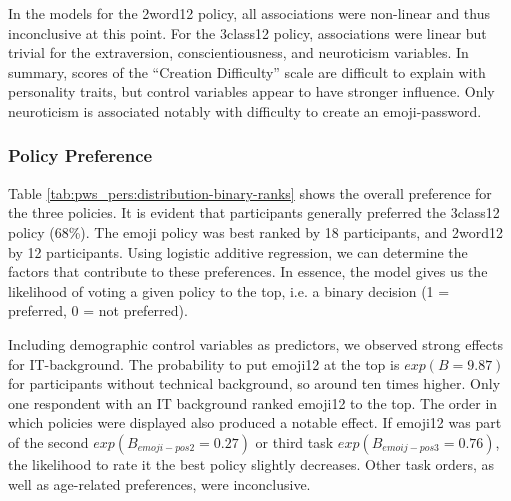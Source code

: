 In the models for the 2word12 policy, all associations were non-linear and thus inconclusive at this point. For the 3class12 policy, associations were linear but trivial for the extraversion, conscientiousness, and neuroticism variables. In summary, scores of the ``Creation Difficulty'' scale are difficult to explain with personality traits, but control variables appear to have stronger influence. Only neuroticism is associated notably with difficulty to create an emoji-password.

\subsubsection{Policy Preference}
Table \ref{tab:pws_pers:distribution-binary-ranks} shows the overall preference for the three policies. It is evident that participants generally preferred the 3class12 policy (68\%). The emoji policy was best ranked by 18 participants, and 2word12 by 12 participants. Using logistic additive regression, we can determine the factors that contribute to these preferences. %
In essence, the model gives us the likelihood of voting a given policy to the top, i.e. a binary decision (1 = preferred, 0 = not preferred). 

Including demographic control variables as predictors, we observed strong effects for IT-background. The probability to put emoji12 at the top is $exp(B=9.87)$ for participants without technical background, so around ten times higher. Only one respondent with an IT background ranked emoji12 to the top. %
The order in which policies were displayed also produced a notable effect. If emoji12 was part of the second $exp(B_{emoji-pos2}=0.27)$ or third task $exp(B_{emoij-pos3}=0.76)$, the likelihood to rate it the best policy slightly decreases. Other task orders, as well as age-related preferences, were inconclusive.

